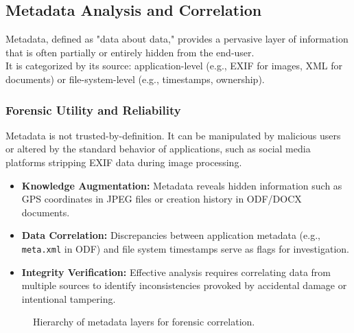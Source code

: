 \subsection{Metadata Analysis and Correlation}

Metadata, defined as "data about data," provides a pervasive layer of information that is often partially or entirely hidden from the end-user.\\
It is categorized by its source: application-level (e.g., EXIF for images, XML for documents) or file-system-level (e.g., timestamps, ownership).

\subsubsection*{Forensic Utility and Reliability}
Metadata is not trusted-by-definition. It can be manipulated by malicious users or altered by the standard behavior of applications, such as social media platforms stripping EXIF data during image processing.

\begin{itemize}
    \item \textbf{Knowledge Augmentation:} Metadata reveals hidden information such as GPS coordinates in JPEG files or creation history in ODF/DOCX documents.
    \item \textbf{Data Correlation:} Discrepancies between application metadata (e.g., \texttt{meta.xml} in ODF) and file system timestamps serve as flags for investigation.
    \item \textbf{Integrity Verification:} Effective analysis requires correlating data from multiple sources to identify inconsistencies provoked by accidental damage or intentional tampering.
\end{itemize}

\begin{figure}[H]
\centering
{}
\caption{Hierarchy of metadata layers for forensic correlation.}
\end{figure}

